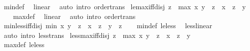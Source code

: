 \begin{isabellebody}
\ min{\isacharunderscore}{\kern0pt}def\ \isamarkupfalse%
\ linear\ \isamarkupfalse%
\ {\isacharparenleft}{\kern0pt}auto\ intro{\isacharcolon}{\kern0pt}\ order{\isacharunderscore}{\kern0pt}trans{\isacharparenright}{\kern0pt}%
\endisatagproof
{\isafoldproof}%
%
\isadelimproof
\isanewline
%
\endisadelimproof
\isanewline
{}\isamarkupfalse%
\ le{\isacharunderscore}{\kern0pt}max{\isacharunderscore}{\kern0pt}iff{\isacharunderscore}{\kern0pt}disj{\isacharcolon}{\kern0pt}\ {\isachardoublequoteopen}z\ {\isasymle}\ max\ x\ y\ {\isasymlongleftrightarrow}\ z\ {\isasymle}\ x\ {\isasymor}\ z\ {\isasymle}\ y{\isachardoublequoteclose}\isanewline
%
\isadelimproof
\ \ %
\endisadelimproof
%
\isatagproof
{}\isamarkupfalse%
\ max{\isacharunderscore}{\kern0pt}def\ \isamarkupfalse%
\ linear\ \isamarkupfalse%
\ {\isacharparenleft}{\kern0pt}auto\ intro{\isacharcolon}{\kern0pt}\ order{\isacharunderscore}{\kern0pt}trans{\isacharparenright}{\kern0pt}%
\endisatagproof
{\isafoldproof}%
%
\isadelimproof
\isanewline
%
\endisadelimproof
\isanewline
{}\isamarkupfalse%
\ min{\isacharunderscore}{\kern0pt}less{\isacharunderscore}{\kern0pt}iff{\isacharunderscore}{\kern0pt}disj{\isacharcolon}{\kern0pt}\ {\isachardoublequoteopen}min\ x\ y\ {\isacharless}{\kern0pt}\ z\ {\isasymlongleftrightarrow}\ x\ {\isacharless}{\kern0pt}\ z\ {\isasymor}\ y\ {\isacharless}{\kern0pt}\ z{\isachardoublequoteclose}\isanewline
%
\isadelimproof
\ \ %
\endisadelimproof
%
\isatagproof
{}\isamarkupfalse%
\ min{\isacharunderscore}{\kern0pt}def\ le{\isacharunderscore}{\kern0pt}less\ \isamarkupfalse%
\ less{\isacharunderscore}{\kern0pt}linear\ \isamarkupfalse%
\ {\isacharparenleft}{\kern0pt}auto\ intro{\isacharcolon}{\kern0pt}\ less{\isacharunderscore}{\kern0pt}trans{\isacharparenright}{\kern0pt}%
\endisatagproof
{\isafoldproof}%
%
\isadelimproof
\isanewline
%
\endisadelimproof
\isanewline
{}\isamarkupfalse%
\ less{\isacharunderscore}{\kern0pt}max{\isacharunderscore}{\kern0pt}iff{\isacharunderscore}{\kern0pt}disj{\isacharcolon}{\kern0pt}\ {\isachardoublequoteopen}z\ {\isacharless}{\kern0pt}\ max\ x\ y\ {\isasymlongleftrightarrow}\ z\ {\isacharless}{\kern0pt}\ x\ {\isasymor}\ z\ {\isacharless}{\kern0pt}\ y{\isachardoublequoteclose}\isanewline
%
\isadelimproof
\ \ %
\endisadelimproof
%
\isatagproof
{}\isamarkupfalse%
\ max{\isacharunderscore}{\kern0pt}def\ le{\isacharunderscore}{\kern0pt}less\ \isamarkupfalse%

\end{isabellebody}
